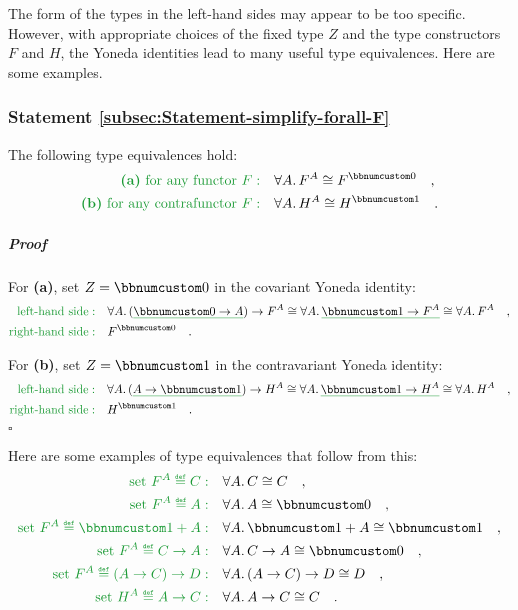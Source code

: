 The form of the types in the left-hand sides may appear to be too
specific. However, with appropriate choices of the fixed type $Z$
and the type constructors $F$ and $H$, the Yoneda identities lead
to many useful type equivalences. Here are some examples.

\subsubsection{Statement \label{subsec:Statement-simplify-forall-F}\ref{subsec:Statement-simplify-forall-F}}

The following type equivalences hold:
\begin{align*}
{\color{greenunder}\text{\textbf{(a)} for any functor }F:}\quad & \forall A.\,F^{A}\cong F^{\bbnum 0}\quad,\\
{\color{greenunder}\text{\textbf{(b)} for any contrafunctor }F:}\quad & \forall A.\,H^{A}\cong H^{\bbnum 1}\quad.
\end{align*}


\subparagraph{Proof}

For \textbf{(a)}, set $Z=\bbnum 0$ in the covariant Yoneda identity:
\begin{align*}
{\color{greenunder}\text{left-hand side}:}\quad & \forall A.\,(\gunderline{\bbnum 0\rightarrow A})\rightarrow F^{A}\cong\forall A.\,\gunderline{\bbnum 1\rightarrow F^{A}}\cong\forall A.\,F^{A}\quad,\\
{\color{greenunder}\text{right-hand side}:}\quad & F^{\bbnum 0}\quad.
\end{align*}

For \textbf{(b)}, set $Z=\bbnum 1$ in the contravariant Yoneda identity:
\begin{align*}
{\color{greenunder}\text{left-hand side}:}\quad & \forall A.\,(\gunderline{A\rightarrow\bbnum 1})\rightarrow H^{A}\cong\forall A.\,\gunderline{\bbnum 1\rightarrow H^{A}}\cong\forall A.\,H^{A}\quad,\\
{\color{greenunder}\text{right-hand side}:}\quad & H^{\bbnum 1}\quad.
\end{align*}
 $\square$

Here are some examples of type equivalences that follow from this:
\begin{align*}
{\color{greenunder}\text{set }F^{A}\triangleq C:}\quad & \forall A.\,C\cong C\quad,\\
{\color{greenunder}\text{set }F^{A}\triangleq A:}\quad & \forall A.\,A\cong\bbnum 0\quad,\\
{\color{greenunder}\text{set }F^{A}\triangleq\bbnum 1+A:}\quad & \forall A.\,\bbnum 1+A\cong\bbnum 1\quad,\\
{\color{greenunder}\text{set }F^{A}\triangleq C\rightarrow A:}\quad & \forall A.\,C\rightarrow A\cong\bbnum 0\quad,\\
{\color{greenunder}\text{set }F^{A}\triangleq(A\rightarrow C)\rightarrow D:}\quad & \forall A.\,(A\rightarrow C)\rightarrow D\cong D\quad,\\
{\color{greenunder}\text{set }H^{A}\triangleq A\rightarrow C:}\quad & \forall A.\,A\rightarrow C\cong C\quad.
\end{align*}

